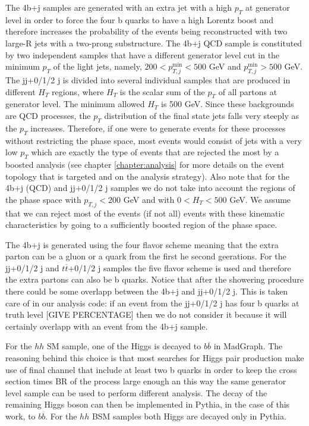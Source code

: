 The 4b+j samples are generated with an extra jet with a high $p_T$ at generator level in order to force the four b quarks to have a high Lorentz boost and therefore increases the probability of the events being reconstructed with two large-R jets with a two-prong substructure. The 4b+j QCD sample is constituted by two independent samples that have a different generator level cut in the minimum $p_T$ of the light jets, namely, $200<p_{T,j}^{\min}<500$ GeV and $p_{T,j}^{\min}>500$ GeV. The jj+0/1/2 j is divided into several individual samples that are produced in different $H_T$ regions, where $H_T$ is the scalar sum of the $p_T$ of all partons at generator level. The minimum allowed $H_T$ is 500 GeV. Since these backgrounds are QCD processes, the $p_T$ distribution of the final state jets falls very steeply as the $p_T$ increases. Therefore, if one were to generate events for these processes without restricting the phase space, most events would consist of jets with a very low $p_T$ which are exactly the type of events that are rejected the most by a boosted analysis (see chapter \ref{chapter:analysis} for more details on the event topology that is targeted and on the analysis strategy). Also note that for the 4b+j (QCD) and jj+0/1/2 j samples we do not take into account the regions of the phase space with $p_{T,j}<200$ GeV and with $0<H_T<500$ GeV. We assume that we can reject most of the events (if not all) events with these kinematic characteristics by going to a sufficiently boosted region of the phase space.

The 4b+j is generated using the four flavor scheme meaning that the extra parton can be a gluon or a quark from the first he second geerations. For the jj+0/1/2 j and $t\overline{t}$+0/1/2 j samples the five flavor scheme is used and therefore the extra partons can also be b quarks. Notice that after the showering procedure there could be some overlapp between the 4b+j and jj+0/1/2 j. This is taken care of in our analysis code: if an event from the jj+0/1/2 j has four b quarks at truth level [GIVE PERCENTAGE] then we do not consider it because it will certainly overlapp with an event from the 4b+j sample. 
 
For the $hh$ SM sample, one of the Higgs is decayed to $b\overline{b}$ in MadGraph. The reasoning behind this choice is that most searches for Higgs pair production make use of final channel that include at least two b quarks in order to keep the cross section times BR of the process large enough an this way the same generator level sample can be used to perform different analysis. The decay of the remaining Higgs boson can then be implemented in Pythia, in the case of this work, to $b\overline{b}$. For the $hh$ BSM samples both Higgs are decayed only in Pythia.

